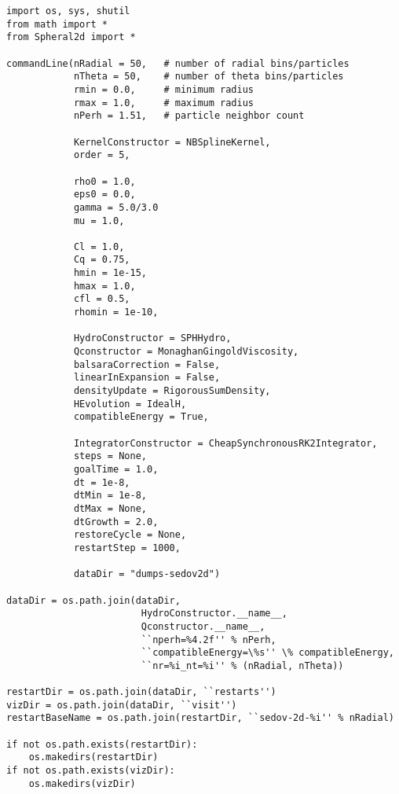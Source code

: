 \documentclass[11pt]{memoir}
\begin{document}
\begin{lstlisting}
import os, sys, shutil
from math import *
from Spheral2d import *

commandLine(nRadial = 50,	# number of radial bins/particles
			nTheta = 50,	# number of theta bins/particles
			rmin = 0.0,		# minimum radius
			rmax = 1.0,		# maximum radius
			nPerh = 1.51,	# particle neighbor count

			KernelConstructor = NBSplineKernel,
			order = 5,
			
			rho0 = 1.0,
			eps0 = 0.0,
			gamma = 5.0/3.0
			mu = 1.0,

			Cl = 1.0,
			Cq = 0.75,
			hmin = 1e-15,
			hmax = 1.0,
			cfl = 0.5,
			rhomin = 1e-10,
			
			HydroConstructor = SPHHydro,
			Qconstructor = MonaghanGingoldViscosity,
			balsaraCorrection = False,
			linearInExpansion = False,
			densityUpdate = RigorousSumDensity,
			HEvolution = IdealH,
			compatibleEnergy = True,

			IntegratorConstructor = CheapSynchronousRK2Integrator,
			steps = None,
			goalTime = 1.0,
			dt = 1e-8,
			dtMin = 1e-8,
			dtMax = None,
			dtGrowth = 2.0,
			restoreCycle = None,
			restartStep = 1000,

			dataDir = "dumps-sedov2d")

dataDir = os.path.join(dataDir,
						HydroConstructor.__name__,
						Qconstructor.__name__,
						``nperh=%4.2f'' % nPerh,
 						``compatibleEnergy=\%s'' \% compatibleEnergy,
						``nr=%i_nt=%i'' % (nRadial, nTheta))

restartDir = os.path.join(dataDir, ``restarts'')
vizDir = os.path.join(dataDir, ``visit'')
restartBaseName = os.path.join(restartDir, ``sedov-2d-%i'' % nRadial)
						
if not os.path.exists(restartDir):
	os.makedirs(restartDir)
if not os.path.exists(vizDir):
	os.makedirs(vizDir)
\end{lstlisting}
\end{document}
